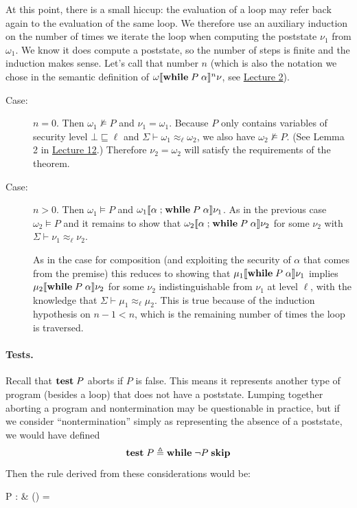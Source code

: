 \documentclass[11pt]{article}
\newcommand{\courseurl}{https://15316-cmu.github.io/2026/}
\begin{document}
At this point, there is a small hiccup: the evaluation of a loop may refer back
again to the evaluation of the same loop.  We therefore use an auxiliary
induction on the number of times we iterate the loop when computing the
poststate $\nu_1$ from $\omega_1$.  We know it does
compute a poststate, so the number of steps is finite and the induction makes
sense.  Let's call that number $n$ (which is also the notation we chose in the
semantic definition of $\omega \llbracket \mathbf{while}\; P\; \alpha\rrbracket^n \nu$, see
\href{\courseurl/lectures/02-semantics.pdf}{Lecture 2}).
\begin{description}
\item[Case:] $n = 0$.  Then $\omega_1 \not\models P$ and
  $\nu_1 = \omega_1$.  Because $P$ only contains variables of security level
  $\bot \sqsubseteq \ell$ and $\Sigma \vdash \omega_1 \approx_\ell \omega_2$, we
  also have $\omega_2 \not\models P$.  (See Lemma 2 in
  \href{\courseurl/lectures/12-infoflow.pdf}{Lecture 12}.)  Therefore
  $\nu_2 = \omega_2$ will satisfy the requirements of the theorem.
\item[Case:] $n > 0$.  Then $\omega_1 \models P$ and
  $\omega_1 \llbracket \alpha \mathrel{;} \mathbf{while}\; P\; \alpha \rrbracket \nu_1$.  As in the
  previous case $\omega_2 \models P$ and it remains to show that
  $\omega_2 \llbracket \alpha \mathrel{;} \mathbf{while}\; P\; \alpha \rrbracket \nu_2$ for some
  $\nu_2$ with $\Sigma \vdash \nu_1 \approx_\ell \nu_2$.

  As in the case for composition (and exploiting the security of $\alpha$ that
  comes from the premise) this reduces to showing that
  $\mu_1 \llbracket \mathbf{while}\; P\; \alpha \rrbracket \nu_1$ implies
  $\mu_2 \llbracket \mathbf{while}\; P\; \alpha \rrbracket \nu_2$ for some $\nu_2$
  indistinguishable from $\nu_1$ at level $\ell$, with the knowledge that
  $\Sigma \vdash \mu_1 \approx_\ell \mu_2$.  This is true because of the
  induction hypothesis on $n-1 < n$, which is the remaining number of times the
  loop is traversed.
\end{description}

\paragraph{Tests.}  Recall that $\mathbf{test}\; P$ aborts if $P$ is false.  This
means it represents another type of program (besides a loop) that does not have a
poststate.  Lumping together aborting a program and nontermination may be
questionable in practice, but if we consider ``nontermination'' simply as
representing the absence of a poststate, we would have defined
\[
  \mathbf{test}\; P \triangleq \mathbf{while}\; \lnot P\; \mathbf{skip}
\]
Then the rule derived from these considerations would be:
\begin{rules}
  {\Sigma \vdash P : \bot & \Sigma() = \bot}
\end{rules}
\end{document}
